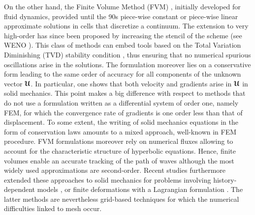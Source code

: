 On the other hand, the Finite Volume Method (FVM) \cite{Leveque}, initially developed for fluid dynamics, provided until the 90s piece-wise constant or piece-wise linear approximate solutions in cells that discretize a continuum.
The extension to very high-order has since been proposed by increasing the stencil of the scheme (see WENO \cite{WENO}).
This class of methods can embed tools based on the Total Variation Diminishing (TVD) stability condition \cite{Harten}, thus ensuring that no numerical spurious oscillations arise in the solutions. 
The formulation moreover lies on a conservative form leading to the same order of accuracy for all components of the unknown vector ${\boldsymbol{\mathcal{U}}}$.
In particular, one shows that both velocity and gradients arise in ${\boldsymbol{\mathcal{U}}}$ in solid mechanics.
This point makes a big difference with respect to methods that do not use a formulation written as a differential system of order one, namely FEM, for which the convergence rate of gradients is one order less than that of displacement.
To some extent, the writing of solid mechanics equations in the form of conservation laws amounts to a mixed approach, well-known in FEM procedure.
FVM formulations moreover rely on numerical fluxes allowing to account for the characteristic structure of hyperbolic equations.
Hence, finite volumes enable an accurate tracking of the path of waves although the most widely used approximations are second-order. %
Recent studies furthermore extended these approaches to solid mechanics for problems involving history-dependent models \cite{Gavrilyuk,Thomas_EP}, or finite deformations with a Lagrangian formulation \cite{Lee_FVM,Haider_FVM}.
The latter methods are nevertheless grid-based techniques for which the numerical difficulties linked to mesh occur.

